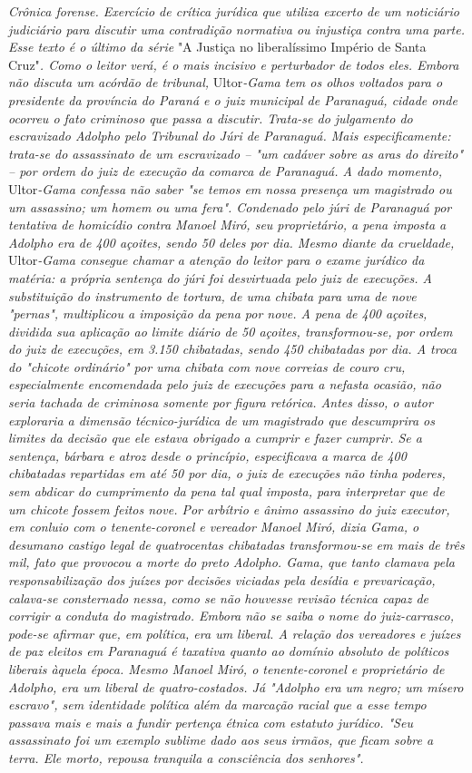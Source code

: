 \emph{Crônica forense. Exercício de crítica jurídica que utiliza excerto
de um noticiário judiciário para discutir uma contradição normativa ou
injustiça contra uma parte. Esse texto é o último da série} "A Justiça
no liberalíssimo Império de Santa Cruz"\emph{. Como o leitor verá, é o
mais incisivo e perturbador de todos eles. Embora não discuta um acórdão
de tribunal,} Ultor\emph{-Gama tem os olhos voltados para o presidente
da província do Paraná e o juiz municipal de Paranaguá, cidade onde
ocorreu o fato criminoso que passa a discutir. Trata-se do julgamento do
escravizado Adolpho pelo Tribunal do Júri de Paranaguá. Mais
especificamente: trata-se do assassinato de um escravizado -- "um
cadáver sobre as aras do direito" -- por ordem do juiz de execução da
comarca de Paranaguá. A dado momento,} Ultor\emph{-Gama confessa não
saber "se temos em nossa presença um magistrado ou um assassino; um
homem ou uma fera". Condenado pelo júri de Paranaguá por tentativa de
homicídio contra Manoel Miró, seu proprietário, a pena imposta a Adolpho
era de 400 açoites, sendo 50 deles por dia. Mesmo diante da crueldade,}
Ultor\emph{-Gama consegue chamar a atenção do leitor para o exame
jurídico da matéria: a própria sentença do júri foi desvirtuada pelo
juiz de execuções. A substituição do instrumento de tortura, de uma
chibata para uma de nove "pernas", multiplicou a imposição da pena por
nove. A pena de 400 açoites, dividida sua aplicação ao limite diário de
50 açoites, transformou-se, por ordem do juiz de execuções, em 3.150
chibatadas, sendo 450 chibatadas por dia. A troca do "chicote ordinário"
por uma chibata com nove correias de couro cru, especialmente
encomendada pelo juiz de execuções para a nefasta ocasião, não seria
tachada de criminosa somente por figura retórica. Antes disso, o autor
exploraria a dimensão técnico-jurídica de um magistrado que descumprira
os limites da decisão que ele estava obrigado a cumprir e fazer cumprir.
Se a sentença, bárbara e atroz desde o princípio, especificava a marca
de 400 chibatadas repartidas em até 50 por dia, o juiz de execuções não
tinha poderes, sem abdicar do cumprimento da pena tal qual imposta, para
interpretar que de um chicote fossem feitos nove. Por arbítrio e ânimo
assassino do juiz executor, em conluio com o tenente-coronel e vereador
Manoel Miró, dizia Gama, o desumano castigo legal de quatrocentas
chibatadas transformou-se em mais de três mil, fato que provocou a morte
do preto Adolpho. Gama, que tanto clamava pela responsabilização dos
juízes por decisões viciadas pela desídia e prevaricação, calava-se
consternado nessa, como se não houvesse revisão técnica capaz de
corrigir a conduta do magistrado. Embora não se saiba o nome do
juiz-carrasco, pode-se afirmar que, em política, era um liberal. A
relação dos vereadores e juízes de paz eleitos em Paranaguá é taxativa
quanto ao domínio absoluto de políticos liberais àquela época. Mesmo
Manoel Miró, o tenente-coronel e proprietário de Adolpho, era um liberal
de quatro-costados. Já "Adolpho era um negro; um mísero escravo", sem
identidade política além da marcação racial que a esse tempo passava
mais e mais a fundir pertença étnica com estatuto jurídico. "Seu
assassinato foi um exemplo sublime dado aos seus irmãos, que ficam sobre
a terra. Ele morto, repousa tranquila a consciência dos senhores".}


